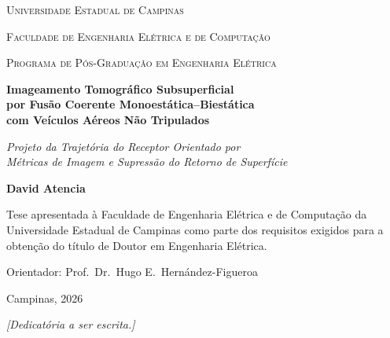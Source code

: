 \documentclass[12pt,a4paper,oneside]{book}
\theoremstyle{remark}
\theoremstyle{plain}
\theoremstyle{definition}
\begin{document}

\frontmatter
\begin{titlepage}
  \centering\vspace*{1.5cm}
  {\Large\textsc{Universidade Estadual de Campinas}\par}
  {\large\textsc{Faculdade de Engenharia Elétrica e de Computação}\par}
  \vspace{0.5cm}
  {\large\textsc{Programa de Pós-Graduação em Engenharia Elétrica}\par}
  \vfill
  {\LARGE\bfseries Imageamento Tomográfico Subsuperficial\\[0.4em]
   por Fusão Coerente Monoestática--Biestática\\[0.4em]
   com Veículos Aéreos Não Tripulados\par}
  \vspace{1cm}
  {\Large\itshape Projeto da Trajetória do Receptor Orientado por\\
   Métricas de Imagem e Supressão do Retorno de Superfície\par}
  \vfill
  {\large\textbf{David Atencia}\par}
  \vspace{0.6cm}
  {\normalsize Tese apresentada à Faculdade de Engenharia Elétrica e de
   Computação da Universidade Estadual de Campinas como parte dos requisitos
   exigidos para a obtenção do título de Doutor em Engenharia Elétrica.\par}
  \vspace{0.4cm}
  {\normalsize Orientador: Prof.\ Dr.\ Hugo E.\ Hernández-Figueroa\par}
  \vspace{0.4cm}
  {\normalsize Campinas, 2026\par}
\end{titlepage}

\cleardoublepage
\thispagestyle{empty}
\vspace*{\fill}
\begin{flushright}
  \textit{[Dedicatória a ser escrita.]}
\end{flushright}
\vspace*{\fill}

\end{document}
